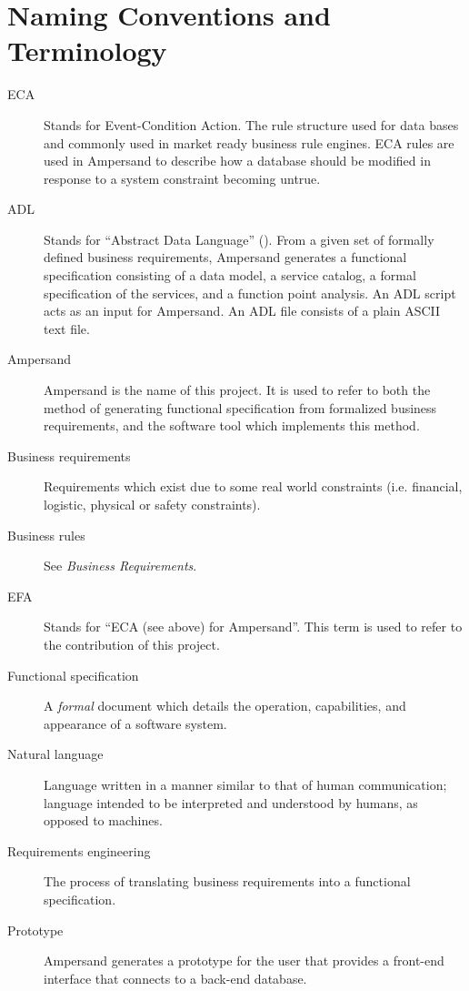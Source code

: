 \documentclass[12pt]{report}
\begin{document}
\section{Naming Conventions and Terminology}\label{sec:Naming} 
\begin{description}
\item[ECA] Stands for Event-Condition Action. The rule structure used for data
  bases and commonly used in market ready business rule engines. ECA rules are
  used in Ampersand to describe how a database should be modified in response to
  a system constraint becoming untrue. 

\item [ADL] Stands for ``Abstract Data Language'' (\cite[13]{derFun}). From a
given set of formally defined business requirements, Ampersand generates a
functional specification consisting of a data model, a service catalog, a
formal specification of the services, and a function point analysis. An ADL
script acts as an input for Ampersand. An ADL file consists of a plain ASCII
text file.

\item [Ampersand] Ampersand is the name of this project. It is used to refer to
both the method of generating functional specification from formalized
business requirements, and the software tool which implements this method.

\item [Business requirements] Requirements which exist due to some real world 
constraints (i.e. financial, logistic, physical or safety constraints). 

\item [Business rules] See \emph{Business Requirements}.

\item [EFA] Stands for ``ECA (see above) for Ampersand''. This term is used to 
refer to the contribution of this project. 

\item [Functional specification] A \emph{formal} document which details the operation,
  capabilities, and appearance of a software system. 

\item [Natural language] Language written in a manner similar to that of human 
communication; language intended to be interpreted and understood by humans, as 
opposed to machines. 

\item [Requirements engineering] The process of translating business
requirements into a functional specification. 

\item [Prototype] Ampersand generates a prototype for the user that provides a 
front-end interface that connects to a back-end database.

\end{description}
\end{document}
